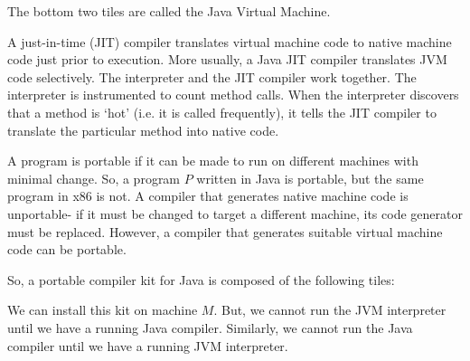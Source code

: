 \documentclass[a4paper, openany]{memoir}
\begin{document}
\noindent The bottom two tiles are called the Java Virtual Machine.

A just-in-time (JIT) compiler translates virtual machine code to native machine code just prior to execution. More usually, a Java JIT compiler translates JVM code selectively. The interpreter and the JIT compiler work together. The interpreter is instrumented to count method calls. When the interpreter discovers that a method is `hot' (i.e. it is called frequently), it tells the JIT compiler to translate the particular method into native code.

A program is portable if it can be made to run on different machines with minimal change. So, a program $P$ written in Java is portable, but the same program in x86 is not. A compiler that generates native machine code is unportable- if it must be changed to target a different machine, its code generator must be replaced. However, a compiler that generates suitable virtual machine code can be portable.

So, a portable compiler kit for Java is composed of the following tiles:
\begin{figure}[H]
    \centering
\end{figure}
\noindent We can install this kit on machine $M$. But, we cannot run the JVM interpreter until we have a running Java compiler. Similarly, we cannot run the Java compiler until we have a running JVM interpreter.
\end{document}
